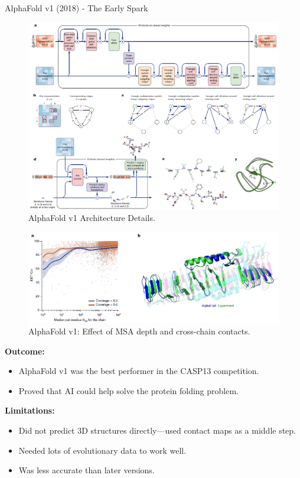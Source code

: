 \begin{frame}[allowframebreaks]{AlphaFold v1 (2018) - The Early Spark}
    \framebreak

    \begin{figure}
        \centering
        \includegraphics[width=\linewidth,height=0.85\textheight,keepaspectratio]{images/science/alphafold-1-architecture-2.png}
        \caption*{AlphaFold v1 Architecture Details.}
    \end{figure}
    
    \framebreak

    \begin{figure}
        \centering
        \includegraphics[width=\linewidth,height=0.85\textheight,keepaspectratio]{images/science/alphafold-1-msa-depth.png}
        \caption*{AlphaFold v1: Effect of MSA depth and cross-chain contacts.}
    \end{figure}
    
    \framebreak

    \textbf{Outcome:}
    \begin{itemize}
        \item AlphaFold v1 was the best performer in the CASP13 competition.
        \item Proved that AI could help solve the protein folding problem.
    \end{itemize}

    \textbf{Limitations:}
    \begin{itemize}
        \item Did not predict 3D structures directly—used contact maps as a middle step.
        \item Needed lots of evolutionary data to work well.
        \item Was less accurate than later versions.
    \end{itemize}
\end{frame}


